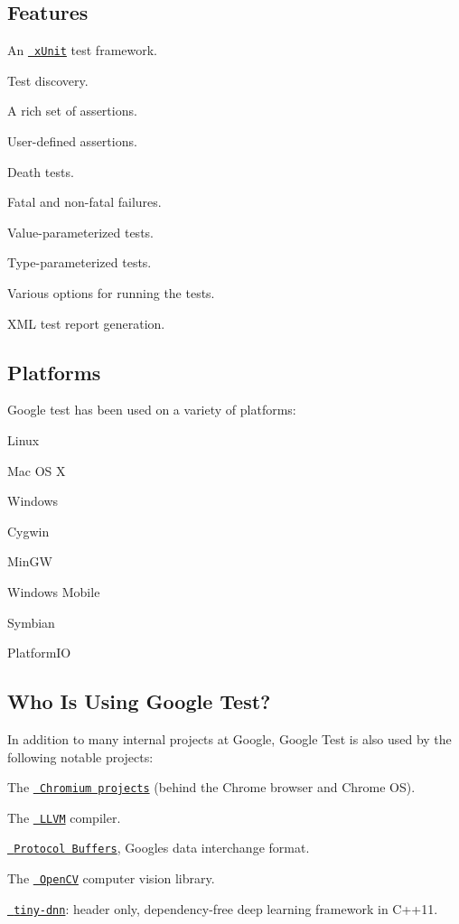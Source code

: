 \subsection*{Features}


\begin{DoxyItemize}
\item An \href{https://en.wikipedia.org/wiki/XUnit}{\texttt{ x\+Unit}} test framework.
\item Test discovery.
\item A rich set of assertions.
\item User-\/defined assertions.
\item Death tests.
\item Fatal and non-\/fatal failures.
\item Value-\/parameterized tests.
\item Type-\/parameterized tests.
\item Various options for running the tests.
\item X\+ML test report generation.
\end{DoxyItemize}

\subsection*{Platforms}

Google test has been used on a variety of platforms\+:


\begin{DoxyItemize}
\item Linux
\item Mac OS X
\item Windows
\item Cygwin
\item Min\+GW
\item Windows Mobile
\item Symbian
\item Platform\+IO
\end{DoxyItemize}

\subsection*{Who Is Using Google Test?}

In addition to many internal projects at Google, Google Test is also used by the following notable projects\+:


\begin{DoxyItemize}
\item The \href{http://www.chromium.org/}{\texttt{ Chromium projects}} (behind the Chrome browser and Chrome OS).
\item The \href{http://llvm.org/}{\texttt{ L\+L\+VM}} compiler.
\item \href{https://github.com/google/protobuf}{\texttt{ Protocol Buffers}}, Google\textquotesingle{}s data interchange format.
\item The \href{http://opencv.org/}{\texttt{ Open\+CV}} computer vision library.
\item \href{https://github.com/tiny-dnn/tiny-dnn}{\texttt{ tiny-\/dnn}}\+: header only, dependency-\/free deep learning framework in C++11.
\end{DoxyItemize}

